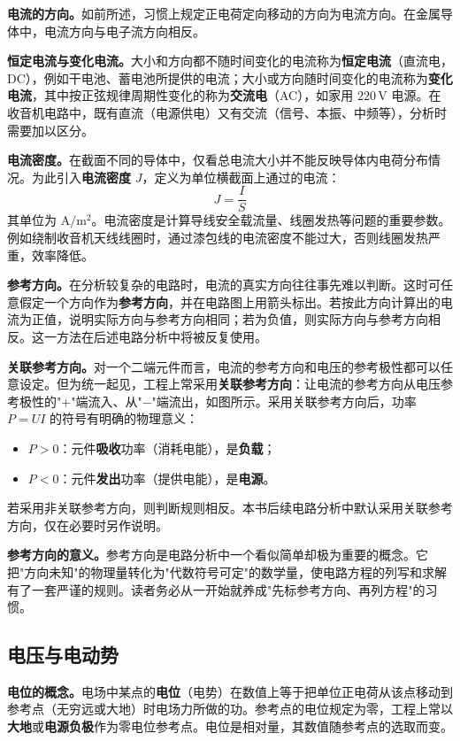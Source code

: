 \documentclass[12pt,UTF8]{ctexbook}
\begin{document}
\textbf{电流的方向。}如前所述，习惯上规定正电荷定向移动的方向为电流方向。在金属导体中，电流方向与电子流方向相反。

\textbf{恒定电流与变化电流。}大小和方向都不随时间变化的电流称为\textbf{恒定电流}（直流电，DC），例如干电池、蓄电池所提供的电流；大小或方向随时间变化的电流称为\textbf{变化电流}，其中按正弦规律周期性变化的称为\textbf{交流电}（AC），如家用 $220\,\mathrm{V}$ 电源。在收音机电路中，既有直流（电源供电）又有交流（信号、本振、中频等），分析时需要加以区分。

\textbf{电流密度。}在截面不同的导体中，仅看总电流大小并不能反映导体内电荷分布情况。为此引入\textbf{电流密度} $J$，定义为单位横截面上通过的电流：
\[
J = \frac{I}{S}
\]
其单位为 $\mathrm{A/m^2}$。电流密度是计算导线安全载流量、线圈发热等问题的重要参数。例如绕制收音机天线线圈时，通过漆包线的电流密度不能过大，否则线圈发热严重，效率降低。

\textbf{参考方向。}在分析较复杂的电路时，电流的真实方向往往事先难以判断。这时可任意假定一个方向作为\textbf{参考方向}，并在电路图上用箭头标出。若按此方向计算出的电流为正值，说明实际方向与参考方向相同；若为负值，则实际方向与参考方向相反。这一方法在后述电路分析中将被反复使用。

\textbf{关联参考方向。}对一个二端元件而言，电流的参考方向和电压的参考极性都可以任意设定。但为统一起见，工程上常采用\textbf{关联参考方向}：让电流的参考方向从电压参考极性的"$+$"端流入、从"$-$"端流出，如图所示。采用关联参考方向后，功率 $P = UI$ 的符号有明确的物理意义：
\begin{itemize}
  \item $P > 0$：元件\textbf{吸收}功率（消耗电能），是\textbf{负载}；
  \item $P < 0$：元件\textbf{发出}功率（提供电能），是\textbf{电源}。
\end{itemize}
若采用非关联参考方向，则判断规则相反。本书后续电路分析中默认采用关联参考方向，仅在必要时另作说明。


\textbf{参考方向的意义。}参考方向是电路分析中一个看似简单却极为重要的概念。它把"方向未知"的物理量转化为"代数符号可定"的数学量，使电路方程的列写和求解有了一套严谨的规则。读者务必从一开始就养成"先标参考方向、再列方程"的习惯。

\subsection{电压与电动势}

\textbf{电位的概念。}电场中某点的\textbf{电位}（电势）在数值上等于把单位正电荷从该点移动到参考点（无穷远或大地）时电场力所做的功。参考点的电位规定为零，工程上常以\textbf{大地}或\textbf{电源负极}作为零电位参考点。电位是相对量，其数值随参考点的选取而变。
\end{document}

